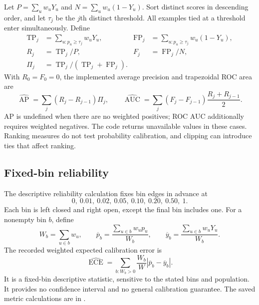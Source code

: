\documentclass[11pt,a4paper]{article}
\begin{document}
Let $P=\sum_uw_uY_u$ and $N=\sum_uw_u(1-Y_u)$. Sort distinct scores in
descending order, and let $\tau_j$ be the $j$th distinct threshold. All
examples tied at a threshold enter simultaneously. Define
\begin{align}
 \operatorname{TP}_j&=\sum_{u:p_u\geq\tau_j}w_uY_u,&
 \operatorname{FP}_j&=\sum_{u:p_u\geq\tau_j}w_u(1-Y_u),\\
 R_j&=\operatorname{TP}_j/P,&
 F_j&=\operatorname{FP}_j/N,\\
 \Pi_j&=\operatorname{TP}_j/(\operatorname{TP}_j+\operatorname{FP}_j).
\end{align}
With $R_0=F_0=0$, the implemented average precision and trapezoidal ROC
area are
\begin{equation}
 \widehat{\operatorname{AP}}=\sum_j(R_j-R_{j-1})\Pi_j,\qquad
 \widehat{\operatorname{AUC}}=\sum_j(F_j-F_{j-1})\frac{R_j+R_{j-1}}{2}.
\end{equation}
AP is undefined when there are no weighted positives; ROC AUC additionally
requires weighted negatives. The code returns unavailable values in these
cases. Ranking measures do not test probability calibration, and clipping
can introduce ties that affect ranking.

\subsection{Fixed-bin reliability}

The descriptive reliability calculation fixes bin edges in advance at
\begin{equation}
 0,\ 0.01,\ 0.02,\ 0.05,\ 0.10,\ 0.20,\ 0.50,\ 1.
\end{equation}
Each bin is left closed and right open, except the final bin includes one.
For a nonempty bin $b$, define
\begin{equation}
 W_b=\sum_{u\in b}w_u,\qquad
 \overline p_b=\frac{\sum_{u\in b}w_up_u}{W_b},\qquad
 \overline y_b=\frac{\sum_{u\in b}w_uY_u}{W_b}.
\end{equation}
The recorded weighted expected calibration error is
\begin{equation}
 \widehat{\operatorname{ECE}}=\sum_{b:W_b>0}\frac{W_b}{W}
                   |\overline p_b-\overline y_b|.
\end{equation}
It is a fixed-bin descriptive statistic, sensitive to the stated bins and
population. It provides no confidence interval and no general calibration
guarantee. The saved metric calculations are in
.
\end{document}
